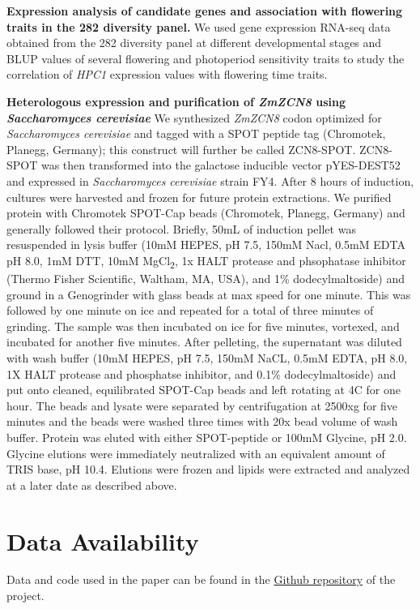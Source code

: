 \documentclass[9pt,twocolumn,twoside,lineno]{biorxiv}
\newcommand{\hpc}{\textit{HPC1}\xspace}
\begin{document}
\textbf{Expression analysis of candidate genes and association with flowering traits in the 282 diversity panel.}
We used gene expression RNA-seq data obtained from the 282 diversity panel at different developmental stages \cite{Kremling2018-gn} and BLUP values of several flowering and photoperiod sensitivity traits \cite{Hung2012-ms} to study the correlation of \hpc expression values with flowering time traits.  

\textbf{Heterologous expression and purification of \textit{ZmZCN8} using \textit{Saccharomyces cerevisiae}}
We synthesized \textit{ZmZCN8} codon optimized for \textit{Saccharomyces cerevisiae} and tagged with a SPOT peptide tag (Chromotek, Planegg, Germany); this construct will further be called ZCN8-SPOT. 
ZCN8-SPOT was then transformed into the galactose inducible vector pYES-DEST52 and expressed in \textit{Saccharomyces cerevisiae} strain FY4. 
After 8 hours of induction, cultures were harvested and frozen for future protein extractions. 
We purified protein with Chromotek SPOT-Cap beads (Chromotek, Planegg, Germany) and generally followed their protocol. 
Briefly, 50mL of induction pellet was resuspended in lysis buffer (10mM HEPES, pH 7.5, 150mM Nacl, 0.5mM EDTA pH 8.0, 1mM DTT, 10mM MgCl\textsubscript{2}, 1x HALT protease and phsophatase inhibitor (Thermo Fisher Scientific, Waltham, MA, USA), and 1\% dodecylmaltoside) and ground in a Genogrinder with glass beads at max speed for one minute.
This was followed by one minute on ice and repeated for a total of three minutes of grinding.
The sample was then incubated on ice for five minutes, vortexed, and incubated for another five minutes. 
After pelleting, the supernatant was diluted with wash buffer (10mM HEPES, pH 7.5, 150mM NaCL, 0.5mM EDTA, pH 8.0, 1X HALT protease and phosphatse inhibitor, and 0.1\% dodecylmaltoside) and put onto cleaned, equilibrated SPOT-Cap beads and left rotating at 4\textdegree C for one hour.
The beads and lysate were separated by centrifugation at 2500xg for five minutes and the beads were washed three times with 20x bead volume of wash buffer. 
Protein was eluted with either SPOT-peptide or 100mM Glycine, pH 2.0. 
Glycine elutions were immediately neutralized with an equivalent amount of TRIS base, pH 10.4.
Elutions were frozen and lipids were extracted and analyzed at a later date as described above.

\section{Data Availability}
Data and code used in the paper can be found in the \href{https://github.com/sawers-rellan-labs/High-PC1-paper}{Github repository} of the project. 
\end{document}
